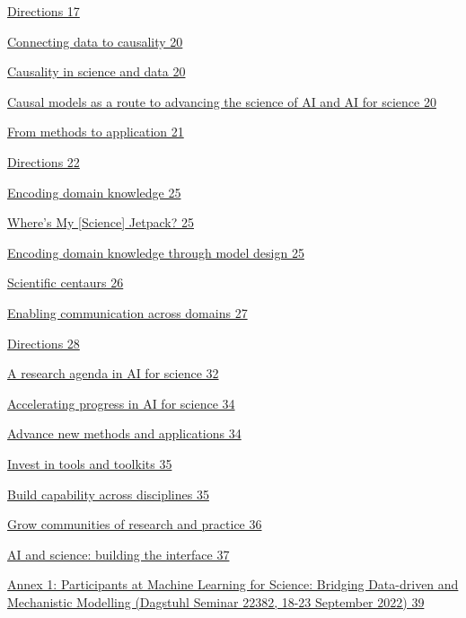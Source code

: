 \protect\hyperlink{directions}{Directions 17}

\protect\hyperlink{connecting-data-to-causality}{Connecting data to
causality 20}

\protect\hyperlink{causality-in-science-and-data}{Causality in science
and data 20}

\protect\hyperlink{causal-models-as-a-route-to-advancing-the-science-of-ai-and-ai-for-science}{Causal
models as a route to advancing the science of AI and AI for science 20}

\protect\hyperlink{from-methods-to-application}{From methods to
application 21}

\protect\hyperlink{directions-1}{Directions 22}

\protect\hyperlink{encoding-domain-knowledge}{Encoding domain knowledge
25}

\protect\hyperlink{wheres-my-science-jetpack}{Where's My {[}Science{]}
Jetpack? 25}

\protect\hyperlink{encoding-domain-knowledge-through-model-design}{Encoding
domain knowledge through model design 25}

\protect\hyperlink{scientific-centaurs}{Scientific centaurs 26}

\protect\hyperlink{enabling-communication-across-domains}{Enabling
communication across domains 27}

\protect\hyperlink{directions-2}{Directions 28}

\protect\hyperlink{a-research-agenda-in-ai-for-science}{A research
agenda in AI for science 32}

\protect\hyperlink{accelerating-progress-in-ai-for-science}{Accelerating
progress in AI for science 34}

\protect\hyperlink{advance-new-methods-and-applications}{Advance new
methods and applications 34}

\protect\hyperlink{invest-in-tools-and-toolkits}{Invest in tools and
toolkits 35}

\protect\hyperlink{build-capability-across-disciplines}{Build capability
across disciplines 35}

\protect\hyperlink{grow-communities-of-research-and-practice}{Grow
communities of research and practice 36}

\protect\hyperlink{ai-and-science-building-the-interface}{AI and
science: building the interface 37}

\protect\hyperlink{annex-1-participants-at-machine-learning-for-science-bridging-data-driven-and-mechanistic-modelling-dagstuhl-seminar-22382-18-23-september-2022}{Annex
1: Participants at Machine Learning for Science: Bridging Data-driven
and Mechanistic Modelling (Dagstuhl Seminar 22382, 18-23 September 2022)
39}

